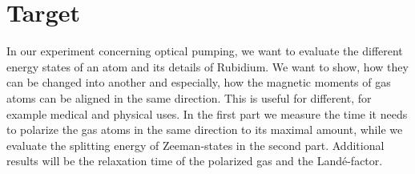 \section{Target}
In our experiment concerning optical pumping, we want to evaluate the different energy states of an atom and its details of Rubidium. We want to show, how they can be changed into another and especially, how the magnetic moments of gas atoms can be aligned in the same direction. This is useful for different, for example medical and physical uses. In the first part we measure the time it needs to polarize the gas atoms in the same direction to its maximal amount, while we evaluate the splitting energy of Zeeman-states in the second part. Additional results will be the relaxation time of the polarized gas and the Landé-factor.
